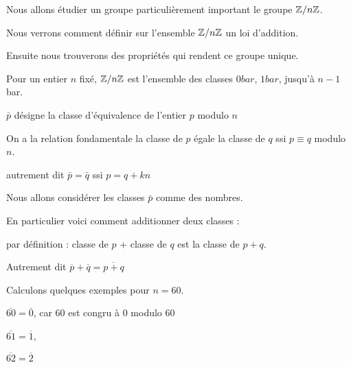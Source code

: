 







\debuttexte

\diapo

\change

Nous allons étudier un groupe particulièrement important le groupe $\mathbb{Z}/n\mathbb{Z}$.

\change

Nous verrons comment définir sur l'ensemble  $\mathbb{Z}/n\mathbb{Z}$ un loi d'addition.

\change

Ensuite nous trouverons des propriétés qui rendent ce groupe unique.

\diapo

Pour un entier $n$ fixé, $\mathbb{Z}/n\mathbb{Z}$ est l'ensemble
des classes $0 bar$, $1 bar$,  jusqu'à $n-1$ bar.

\change

$\bar p$ désigne la classe d'équivalence de l'entier $p$ modulo $n$


On a la relation fondamentale la classe de $p$ égale la classe de $q$ ssi $p \equiv q$ modulo $n$.

\change

autrement dit $\bar p = \bar q$ ssi  $p = q + kn$

\change

Nous allons considérer les classes $\bar p$ comme des nombres.

En particulier voici comment additionner deux classes :

par définition : classe de $p$ + classe de $q$ est
la classe de $p+q$.

Autrement dit $\overline p + \overline q = \overline{p+q}$


\diapo

Calculons quelques exemples pour $n=60$.

$\overline{60}=\overline{0}$, car $60$ est congru à $0$ modulo $60$

$\overline{61}=\overline{1}$,

$\overline{62}=\overline{2}$

\change

